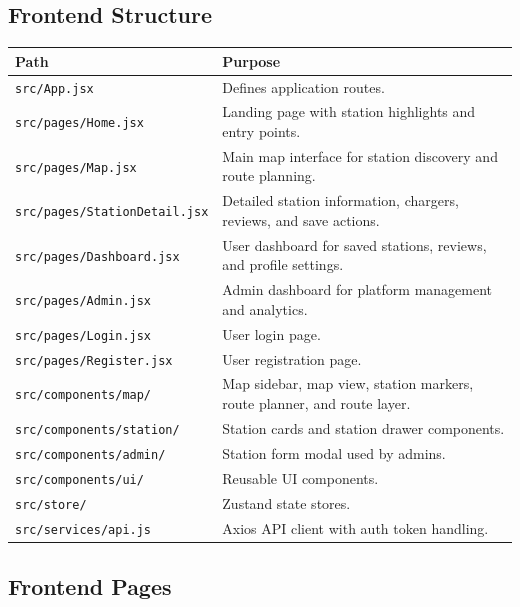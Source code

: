 \documentclass[12pt,a4paper]{article}
\begin{document}
\subsection{Frontend Structure}

\begin{longtable}{p{4cm}p{10cm}}
\toprule
\textbf{Path} & \textbf{Purpose} \\
\midrule
\texttt{src/App.jsx} & Defines application routes. \\
\texttt{src/pages/Home.jsx} & Landing page with station highlights and entry points. \\
\texttt{src/pages/Map.jsx} & Main map interface for station discovery and route planning. \\
\texttt{src/pages/StationDetail.jsx} & Detailed station information, chargers, reviews, and save actions. \\
\texttt{src/pages/Dashboard.jsx} & User dashboard for saved stations, reviews, and profile settings. \\
\texttt{src/pages/Admin.jsx} & Admin dashboard for platform management and analytics. \\
\texttt{src/pages/Login.jsx} & User login page. \\
\texttt{src/pages/Register.jsx} & User registration page. \\
\texttt{src/components/map/} & Map sidebar, map view, station markers, route planner, and route layer. \\
\texttt{src/components/station/} & Station cards and station drawer components. \\
\texttt{src/components/admin/} & Station form modal used by admins. \\
\texttt{src/components/ui/} & Reusable UI components. \\
\texttt{src/store/} & Zustand state stores. \\
\texttt{src/services/api.js} & Axios API client with auth token handling. \\
\bottomrule
\end{longtable}

\subsection{Frontend Pages}
\end{document}
